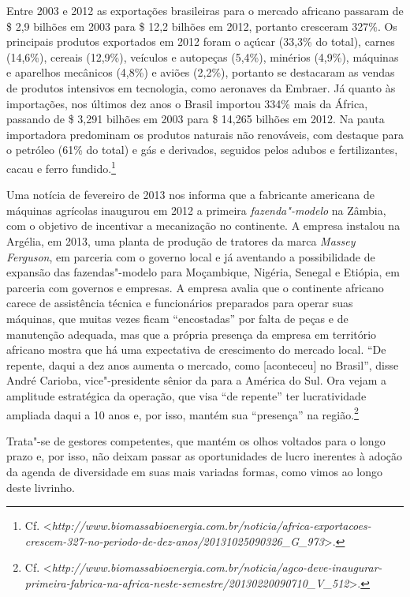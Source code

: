 Entre 2003 e 2012 as exportações brasileiras para o mercado africano
passaram de \$ 2,9 bilhões em 2003 para \$ 12,2 bilhões em 2012,
portanto cresceram 327\%. Os principais produtos exportados em 2012
foram o açúcar (33,3\% do total), carnes (14,6\%), cereais (12,9\%),
veículos e autopeças (5,4\%), minérios (4,9\%), máquinas e aparelhos
mecânicos (4,8\%) e aviões (2,2\%), portanto se destacaram as vendas de
produtos intensivos em tecnologia, como aeronaves da Embraer. Já quanto
às importações, nos últimos dez anos o Brasil importou 334\% mais da
África, passando de \$ 3,291 bilhões em 2003 para \$ 14,265 bilhões
em 2012. Na pauta importadora predominam os produtos naturais não
renováveis, com destaque para o petróleo (61\% do total) e gás e
derivados, seguidos pelos adubos e fertilizantes, cacau e ferro
fundido.\footnote{Cf.
  \textless{}\emph{http://www.biomassabioenergia.com.br/noticia/africa-exportacoes-crescem-327-no-periodo-de-dez-anos/20131025090326\_G\_973}\textgreater{}.}

Uma notícia de fevereiro de 2013 nos informa que a fabricante americana
de máquinas agrícolas  inaugurou em 2012 a primeira
\emph{fazenda"-modelo} na Zâmbia, com o objetivo de incentivar a
mecanização no continente. A empresa instalou na Argélia, em 2013, uma
planta de produção de tratores da marca \emph{Massey Ferguson}, em
parceria com o governo local e já aventando a possibilidade de expansão
das fazendas"-modelo para Moçambique, Nigéria, Senegal e Etiópia, em
parceria com governos e empresas. A empresa avalia que o continente
africano carece de assistência técnica e funcionários preparados para
operar suas máquinas, que muitas vezes ficam ``encostadas'' por falta de
peças e de manutenção adequada, mas que a própria presença da empresa em
território africano mostra que há uma expectativa de crescimento do
mercado local. ``De repente, daqui a dez anos aumenta o mercado, como
{[}aconteceu{]} no Brasil'', disse André Carioba, vice"-presidente sênior
da  para a América do Sul. Ora vejam a amplitude estratégica da
operação, que visa ``de repente'' ter lucratividade ampliada daqui a 10
anos e, por isso, mantém sua ``presença'' na região.\footnote{Cf.
  \textless{}\emph{http://www.biomassabioenergia.com.br/noticia/agco-deve-inaugurar-primeira-fabrica-na-africa-neste-semestre/20130220090710\_V\_512}\textgreater{}.}

Trata"-se de gestores competentes, que mantém os olhos voltados para o
longo prazo e, por isso, não deixam passar as oportunidades de lucro
inerentes à adoção da agenda de diversidade em suas mais variadas
formas, como vimos ao longo deste livrinho.

